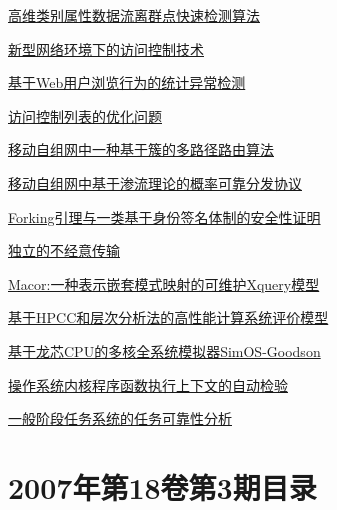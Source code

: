 \documentclass[a4paper]{article}
\begin{document}
\href{http://www.jos.org.cn/ch/reader/download_pdf.aspx?file_no=20070415&year_id=2007&quarter_id=4&falg=1}{高维类别属性数据流离群点快速检测算法}

\href{http://www.jos.org.cn/ch/reader/download_pdf.aspx?file_no=20070417&year_id=2007&quarter_id=4&falg=1}{新型网络环境下的访问控制技术}

\href{http://www.jos.org.cn/ch/reader/download_pdf.aspx?file_no=20070418&year_id=2007&quarter_id=4&falg=1}{基于Web用户浏览行为的统计异常检测}

\href{http://www.jos.org.cn/ch/reader/download_pdf.aspx?file_no=20070419&year_id=2007&quarter_id=4&falg=1}{访问控制列表的优化问题}

\href{http://www.jos.org.cn/ch/reader/download_pdf.aspx?file_no=20070420&year_id=2007&quarter_id=4&falg=1}{移动自组网中一种基于簇的多路径路由算法}

\href{http://www.jos.org.cn/ch/reader/download_pdf.aspx?file_no=20070421&year_id=2007&quarter_id=4&falg=1}{移动自组网中基于渗流理论的概率可靠分发协议}

\href{http://www.jos.org.cn/ch/reader/download_pdf.aspx?file_no=20070422&year_id=2007&quarter_id=4&falg=1}{Forking引理与一类基于身份签名体制的安全性证明}

\href{http://www.jos.org.cn/ch/reader/download_pdf.aspx?file_no=20070423&year_id=2007&quarter_id=4&falg=1}{独立的不经意传输}

\href{http://www.jos.org.cn/ch/reader/download_pdf.aspx?file_no=20070424&year_id=2007&quarter_id=4&falg=1}{Macor:一种表示嵌套模式映射的可维护Xquery模型}

\href{http://www.jos.org.cn/ch/reader/download_pdf.aspx?file_no=20070425&year_id=2007&quarter_id=4&falg=1}{基于HPCC和层次分析法的高性能计算系统评价模型}

\href{http://www.jos.org.cn/ch/reader/download_pdf.aspx?file_no=20070426&year_id=2007&quarter_id=4&falg=1}{基于龙芯CPU的多核全系统模拟器SimOS-Goodson}

\href{http://www.jos.org.cn/ch/reader/download_pdf.aspx?file_no=20070427&year_id=2007&quarter_id=4&falg=1}{操作系统内核程序函数执行上下文的自动检验}

\href{http://www.jos.org.cn/ch/reader/download_pdf.aspx?file_no=20070428&year_id=2007&quarter_id=4&falg=1}{一般阶段任务系统的任务可靠性分析}


\section{\textbf{2007年第18卷第3期目录}}
\end{document}
